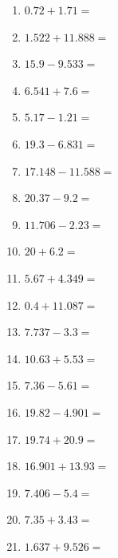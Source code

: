 \documentclass[12pt]{article}
\begin{document}
\begin{enumerate}
\item \large $ 0.72 + 1.71 = $ \vspace{1.5cm}
\newpage
\item \large $ 1.522 + 11.888 = $ \vspace{1.5cm}
\item \large $ 15.9 - 9.533 = $ \vspace{1.5cm}
\item \large $ 6.541 + 7.6 = $ \vspace{1.5cm}
\item \large $ 5.17 - 1.21 = $ \vspace{1.5cm}
\item \large $ 19.3 - 6.831 = $ \vspace{1.5cm}
\item \large $ 17.148 - 11.588 = $ \vspace{1.5cm}
\item \large $ 20.37 - 9.2 = $ \vspace{1.5cm}
\item \large $ 11.706 - 2.23 = $ \vspace{1.5cm}
\item \large $ 20 + 6.2 = $ \vspace{1.5cm}
\item \large $ 5.67 + 4.349 = $ \vspace{1.5cm}
\newpage
\item \large $ 0.4 + 11.087 = $ \vspace{1.5cm}
\item \large $ 7.737 - 3.3 = $ \vspace{1.5cm}
\item \large $ 10.63 + 5.53 = $ \vspace{1.5cm}
\item \large $ 7.36 - 5.61 = $ \vspace{1.5cm}
\item \large $ 19.82 - 4.901 = $ \vspace{1.5cm}
\item \large $ 19.74 + 20.9 = $ \vspace{1.5cm}
\item \large $ 16.901 + 13.93 = $ \vspace{1.5cm}
\item \large $ 7.406 - 5.4 = $ \vspace{1.5cm}
\item \large $ 7.35 + 3.43 = $ \vspace{1.5cm}
\item \large $ 1.637 + 9.526 = $ \vspace{1.5cm}

\end{enumerate}
\end{document}
